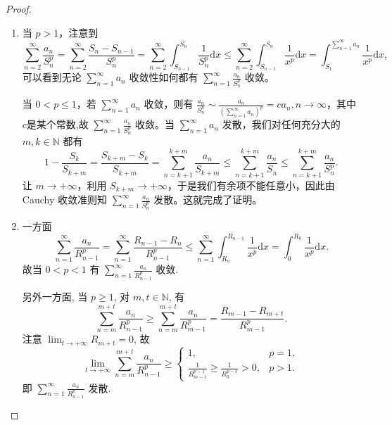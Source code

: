 \documentclass[../../main.tex]{subfiles}%
\begin{document}
\begin{proof}
\begin{enumerate}[(1)]
\item 当 \( p > 1 \)，注意到
\[
\sum_{n = 2}^{\infty} \frac{a_n}{S_n^p} = \sum_{n = 2}^{\infty} \frac{S_n - S_{n - 1}}{S_n^p} = \sum_{n = 2}^{\infty} \int_{S_{n - 1}}^{S_n} \frac{1}{S_n^p} \mathrm{d}x \leqslant \sum_{n = 2}^{\infty} \int_{S_{n - 1}}^{S_n} \frac{1}{x^p} \mathrm{d}x = \int_{S_1}^{\sum\limits_{n = 1}^{\infty} a_n} \frac{1}{x^p} \mathrm{d}x,
\]
可以看到无论 \( \sum_{n = 1}^{\infty} a_n \) 收敛性如何都有 \( \sum_{n = 1}^{\infty} \frac{a_n}{S_n^p} \) 收敛。

当 \( 0 < p \leqslant 1 \)，若 \( \sum_{n = 1}^{\infty} a_n \) 收敛，则有 \( \frac{a_n}{S_n^p} \sim \frac{a_n}{\left( \sum\limits_{n = 1}^{\infty} a_n \right)^p}=ca_n, n \to \infty \)，其中$c$是某个常数,故 \( \sum_{n = 1}^{\infty} \frac{a_n}{S_n^p} \) 收敛。当 \( \sum_{n = 1}^{\infty} a_n \) 发散，我们对任何充分大的 \( m, k \in \mathbb{N} \) 都有
\[
1 - \frac{S_k}{S_{k + m}} = \frac{S_{k + m} - S_k}{S_{k + m}} = \sum_{n = k + 1}^{k + m} \frac{a_n}{S_{k + m}} \leqslant \sum_{n = k + 1}^{k + m} \frac{a_n}{S_n} \leqslant \sum_{n = k + 1}^{k + m} \frac{a_n}{S_n^p}.
\]
让 \( m \to +\infty \)，利用 \( S_{k + m} \to +\infty \)，于是我们有余项不能任意小，因此由 Cauchy 收敛准则知 \( \sum_{n = 1}^{\infty} \frac{a_n}{S_n^p} \) 发散。这就完成了证明。

\item 一方面
\[
\sum_{n=1}^{\infty} \frac{a_n}{R_{n-1}^p} = \sum_{n=1}^{\infty} \frac{R_{n-1} - R_n}{R_{n-1}^p} \leqslant \sum_{n=1}^{\infty} \int_{R_n}^{R_{n-1}} \frac{1}{x^p} \mathrm{d}x = \int_{0}^{R_0} \frac{1}{x^p} \mathrm{d}x.
\]
故当 \( 0 < p < 1 \) 有 \( \sum_{n=1}^{\infty} \frac{a_n}{R_{n-1}^p} \) 收敛.

另外一方面, 当 \( p \geqslant 1 \), 对 \( m,t \in \mathbb{N} \), 有
\[
\sum_{n=m}^{m+t}{\frac{a_n}{R_{n-1}^{p}}}\geqslant \sum_{n=m}^{m+t}{\frac{a_n}{R_{m-1}^{p}}}=\frac{R_{m-1}-R_{m+t}}{R_{m-1}^{p}}.
\]
注意 \( \lim_{t \to +\infty} R_{m+t} = 0 \), 故
\[
\lim_{t \to +\infty} \sum_{n=m}^{m+t} \frac{a_n}{R_{n-1}^p} \geqslant \begin{cases}
1, & p = 1, \\
\frac{1}{R_{m-1}^{p-1}} \geqslant \frac{1}{R_0^{p-1}} > 0, & p > 1.
\end{cases}
\]
即 \( \sum_{n=1}^{\infty} \frac{a_n}{R_{n-1}^p} \) 发散.
\end{enumerate}
\end{proof}
\end{document}
